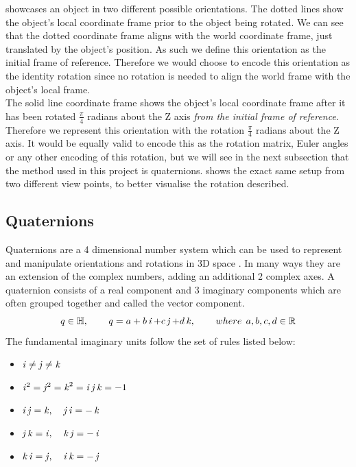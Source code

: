 
 showcases an object in two different possible orientations. The dotted lines show the object's local coordinate frame prior to the object being rotated. We can see that the dotted coordinate frame aligns with the world coordinate frame, just translated by the object's position. As such we define this orientation as the initial frame of reference. Therefore we would choose to encode this orientation as the identity rotation since no rotation is needed to align the world frame with the object's local frame.\\

The solid line coordinate frame shows the object's local coordinate frame after it has been rotated $\frac{\pi}{4}$ radians about the Z axis \textit{from the initial frame of reference}. Therefore we represent this orientation with the rotation $\frac{\pi}{4}$ radians about the Z axis. It would be equally valid to encode this as the rotation matrix, Euler angles or any other encoding of this rotation, but we will see in the next subsection that the method used in this project is quaternions.  shows the exact same setup from two different view points, to better visualise the rotation described.

\subsection{Quaternions}
\label{subsec:quaternions}
Quaternions are a 4 dimensional number system \cite{quaternions} which can be used to represent and manipulate orientations and rotations in 3D space \cite{orientations}. In many ways they are an extension of the complex numbers, adding an additional 2 complex axes. A quaternion consists of a real component and 3 imaginary components which are often grouped together and called the vector component.
$$q \in \operatorname{\mathbb{H}}, \operatorname{\operatorname{\: \: \: \:} \operatorname{\: \: \: \:}} q = a + b\operatorname{\mathit{i}} + c\operatorname{\mathit{j}} + d\operatorname{\mathit{k}}, \operatorname{\operatorname{\: \: \: \:} \operatorname{\: \: \: \:}} where \: \: a,b,c,d \in \operatorname{\mathbb{R}}$$
The fundamental imaginary units follow the set of rules listed below:
\begin{itemize}
    \item $\operatorname{\mathit{i}} \neq \operatorname{\mathit{j}} \neq \operatorname{\mathit{k}}$
    \item $\operatorname{\mathit{i}}^2 = \operatorname{\mathit{j}}^2 = \operatorname{\mathit{k}}^2 = \operatorname{\mathit{i}}\operatorname{\mathit{j}}\operatorname{\mathit{k}} = -1$
    \item $\operatorname{\mathit{i}}\operatorname{\mathit{j}} = \operatorname{\mathit{k}}, \operatorname{\: \: \: \:} \operatorname{\mathit{j}}\operatorname{\mathit{i}} = -\operatorname{\mathit{k}}$
    \item $\operatorname{\mathit{j}}\operatorname{\mathit{k}} = \operatorname{\mathit{i}}, \operatorname{\: \: \: \:} \operatorname{\mathit{k}}\operatorname{\mathit{j}} = -\operatorname{\mathit{i}}$
    \item $\operatorname{\mathit{k}}\operatorname{\mathit{i}} = \operatorname{\mathit{j}}, \operatorname{\: \: \: \:} \operatorname{\mathit{i}}\operatorname{\mathit{k}} = -\operatorname{\mathit{j}}$
\end{itemize}

